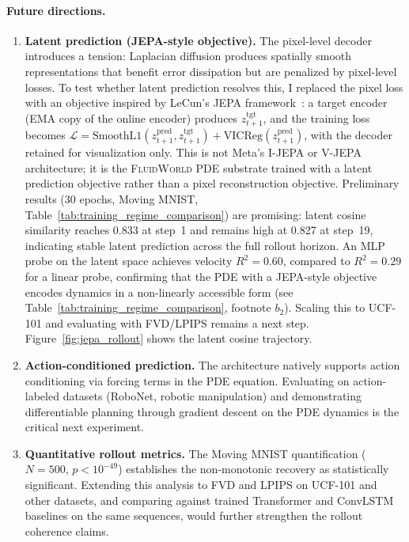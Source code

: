 \documentclass{article}
\newcommand{\fluidworld}{\textsc{FluidWorld}}
\begin{document}
\paragraph{Future directions.}
\begin{enumerate}
    \item \textbf{Latent prediction (JEPA-style objective).} The pixel-level decoder introduces a tension: Laplacian diffusion produces spatially smooth representations that benefit error dissipation but are penalized by pixel-level losses. To test whether latent prediction resolves this, I replaced the pixel loss with an objective inspired by LeCun's JEPA framework~\cite{lecun2022path}: a target encoder (EMA copy of the online encoder) produces $z_{t+1}^{\text{tgt}}$, and the training loss becomes $\mathcal{L} = \text{SmoothL1}(z_{t+1}^{\text{pred}}, z_{t+1}^{\text{tgt}}) + \text{VICReg}(z_{t+1}^{\text{pred}})$, with the decoder retained for visualization only. This is not Meta's I-JEPA or V-JEPA architecture; it is the \fluidworld{} PDE substrate trained with a latent prediction objective rather than a pixel reconstruction objective. Preliminary results (30 epochs, Moving MNIST, Table~\ref{tab:training_regime_comparison}) are promising: latent cosine similarity reaches 0.833 at step~1 and remains high at 0.827 at step~19, indicating stable latent prediction across the full rollout horizon. An MLP probe on the latent space achieves velocity $R^2 = 0.60$, compared to $R^2 = 0.29$ for a linear probe, confirming that the PDE with a JEPA-style objective encodes dynamics in a non-linearly accessible form (see Table~\ref{tab:training_regime_comparison}, footnote $b_2$). Scaling this to UCF-101 and evaluating with FVD/LPIPS remains a next step. Figure~\ref{fig:jepa_rollout} shows the latent cosine trajectory.
    \item \textbf{Action-conditioned prediction.} The architecture natively supports action conditioning via forcing terms in the PDE equation. Evaluating on action-labeled datasets (RoboNet, robotic manipulation) and demonstrating differentiable planning through gradient descent on the PDE dynamics is the critical next experiment.
    \item \textbf{Quantitative rollout metrics.} The Moving MNIST quantification ($N\!=\!500$, $p < 10^{-49}$) establishes the non-monotonic recovery as statistically significant. Extending this analysis to FVD and LPIPS on UCF-101 and other datasets, and comparing against trained Transformer and ConvLSTM baselines on the same sequences, would further strengthen the rollout coherence claims.

\end{enumerate}
\end{document}
